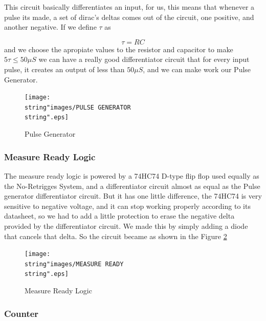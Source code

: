 This circuit basically differentiates an input, for us, this means
that whenever a pulse its made, a set of dirac's deltas comes out
of the circuit, one positive, and another negative. If we define $\tau$
as 

\[
\tau=RC
\]
 and we choose the apropiate values to the resistor and capacitor
to make $5\tau\leq50\mu S$ we can have a really good differentiator
circuit that for every input pulse, it creates an output of less than
$50\mu S$, and we can make work our Pulse Generator.

\begin{figure}[H]
\begin{centering}
\texttt{[image: \\string"images/PULSE GENERATOR\\string".eps]}
\par\end{centering}
\caption{Pulse Generator}
\label{8_5}
\end{figure}

\subsubsection{Measure Ready Logic}

The measure ready logic is powered by a 74HC74 D-type flip flop used
equally as the No-Retrigges System, and a differentiator circuit almost
as equal as the Pulse generator differentiator circuit. But it has
one little difference, the 74HC74 is very sensitive to negative voltage,
and it can stop working properly according to its datasheet, so we
had to add a little protection to erase the negative delta provided
by the differentiator circuit. We made this by simply adding a diode
that cancels that delta. So the circuit became as shown in the Figure
\ref{8_6}

\begin{figure}[H]
\begin{centering}
\texttt{[image: \\string"images/MEASURE READY\\string".eps]}
\par\end{centering}
\caption{Measure Ready Logic}

\label{8_6}
\end{figure}

\subsubsection{Counter}

